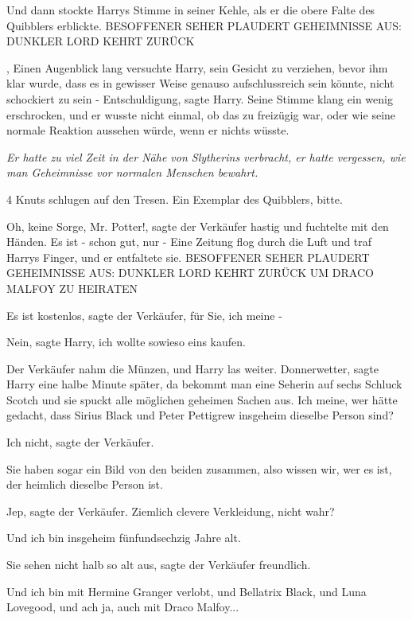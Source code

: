 Und dann stockte Harrys Stimme in seiner Kehle, als er die obere Falte des
Quibblers erblickte. BESOFFENER SEHER PLAUDERT GEHEIMNISSE AUS: DUNKLER LORD
KEHRT ZURÜCK

, Einen Augenblick lang versuchte Harry, sein Gesicht zu verziehen, bevor ihm
klar wurde, dass es in gewisser Weise genauso aufschlussreich sein könnte, nicht
schockiert zu sein - \glqq{}Entschuldigung\grqq{}, sagte Harry. Seine Stimme
klang ein wenig erschrocken, und er wusste nicht einmal, ob das zu freizügig
war, oder wie seine normale Reaktion aussehen würde, wenn er nichts wüsste.

\emph{Er hatte zu viel Zeit in der Nähe von Slytherins verbracht, er hatte
vergessen, wie man Geheimnisse vor normalen Menschen bewahrt.}

4 Knuts schlugen auf den Tresen. \glqq{}Ein Exemplar des Quibblers, bitte.\grqq{}

\glqq{}Oh, keine Sorge, Mr. Potter!\grqq{}, sagte der Verkäufer hastig und
fuchtelte mit den Händen. \glqq{}Es ist - schon gut, nur -\grqq{} Eine Zeitung flog
durch die Luft und traf Harrys Finger, und er entfaltete sie. BESOFFENER SEHER
PLAUDERT GEHEIMNISSE AUS: DUNKLER LORD KEHRT ZURÜCK UM DRACO MALFOY ZU HEIRATEN

\glqq{}Es ist kostenlos\grqq{}, sagte der Verkäufer, \glqq{}für Sie, ich meine
-\grqq{}

\glqq{}Nein\grqq{}, sagte Harry, \glqq{}ich wollte sowieso eins kaufen.\grqq{}

Der Verkäufer nahm die Münzen, und Harry las weiter. \glqq{}Donnerwetter\grqq{},
sagte Harry eine halbe Minute später, \glqq{}da bekommt man eine Seherin auf
sechs Schluck Scotch und sie spuckt alle möglichen geheimen Sachen aus. Ich
meine, wer hätte gedacht, dass Sirius Black und Peter Pettigrew insgeheim
dieselbe Person sind?\grqq{}

\glqq{}Ich nicht\grqq{}, sagte der Verkäufer.

\glqq{}Sie haben sogar ein Bild von den beiden zusammen, also wissen wir, wer es
ist, der heimlich dieselbe Person ist.\grqq{}

\glqq{}Jep\grqq{}, sagte der Verkäufer. \glqq{}Ziemlich clevere Verkleidung,
nicht wahr?\grqq{}

\glqq{}Und ich bin insgeheim fünfundsechzig Jahre alt.\grqq{}

\glqq{}Sie sehen nicht halb so alt aus\grqq{}, sagte der Verkäufer freundlich.

\glqq{}Und ich bin mit Hermine Granger verlobt, und Bellatrix Black, und Luna
Lovegood, und ach ja, auch mit Draco Malfoy...\grqq{}


